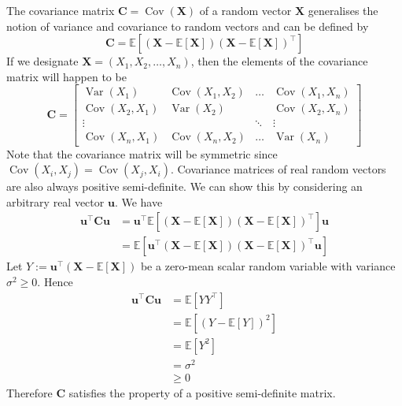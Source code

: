 \documentclass[11pt]{report} %
\begin{document}
The covariance matrix $\mathbf{C} = \operatorname{Cov}\left(\mathbf{X}\right)$ of a random vector $\mathbf{X}$ generalises the notion of variance and covariance to random vectors and can be defined by
\begin{equation}
\mathbf{C} = \mathbb{E}\left[\left(\mathbf{X} - \mathbb{E}\left[\mathbf{X}\right]\right)\left(\mathbf{X} - \mathbb{E}\left[\mathbf{X}\right]\right)^{\top}\right]
\end{equation}
If we designate $\mathbf{X} = \left(X_{1}, X_{2}, \dots, X_{n}\right)$, then the elements of the covariance matrix will happen to be
\begin{equation}
\mathbf{C} = \begin{bmatrix}\operatorname{Var}\left(X_{1}\right) & \operatorname{Cov}\left(X_{1},X_{2}\right) & \dots & \operatorname{Cov}\left(X_{1},X_{n}\right)\\
\operatorname{Cov}\left(X_{2},X_{1}\right) & \operatorname{Var}\left(X_{2}\right) &  & \operatorname{Cov}\left(X_{2},X_{n}\right)\\
\vdots &  & \ddots & \vdots\\
\operatorname{Cov}\left(X_{n},X_{1}\right) & \operatorname{Cov}\left(X_{n},X_{2}\right) & \dots & \operatorname{Var}\left(X_{n}\right)
\end{bmatrix}
\end{equation}
Note that the covariance matrix will be symmetric since $\operatorname{Cov}\left(X_{i},X_{j}\right) = \operatorname{Cov}\left(X_{j},X_{i}\right)$. Covariance matrices of real random vectors are also always positive semi-definite. We can show this by considering an arbitrary real vector $\mathbf{u}$. We have
\begin{align}
\mathbf{u}^{\top}\mathbf{C}\mathbf{u} &= \mathbf{u}^{\top}\mathbb{E}\left[\left(\mathbf{X} - \mathbb{E}\left[\mathbf{X}\right]\right)\left(\mathbf{X} - \mathbb{E}\left[\mathbf{X}\right]\right)^{\top}\right]\mathbf{u} \\
&= \mathbb{E}\left[\mathbf{u}^{\top}\left(\mathbf{X} - \mathbb{E}\left[\mathbf{X}\right]\right)\left(\mathbf{X} - \mathbb{E}\left[\mathbf{X}\right]\right)^{\top}\mathbf{u}\right]
\end{align}
Let $Y := \mathbf{u}^{\top}\left(\mathbf{X} - \mathbb{E}\left[\mathbf{X}\right]\right)$ be a zero-mean scalar random variable with variance $\sigma^{2} \geq 0$. Hence
\begin{align}
\mathbf{u}^{\top}\mathbf{C}\mathbf{u} &= \mathbb{E}\left[YY^{\top}\right] \\
&= \mathbb{E}\left[\left(Y - \mathbb{E}\left[Y\right]\right)^{2}\right] \\
&= \mathbb{E}\left[Y^{2}\right] \\
&= \sigma^{2} \\
&\geq 0
\end{align}
Therefore $\mathbf{C}$ satisfies the property of a positive semi-definite matrix. \\
\end{document}
